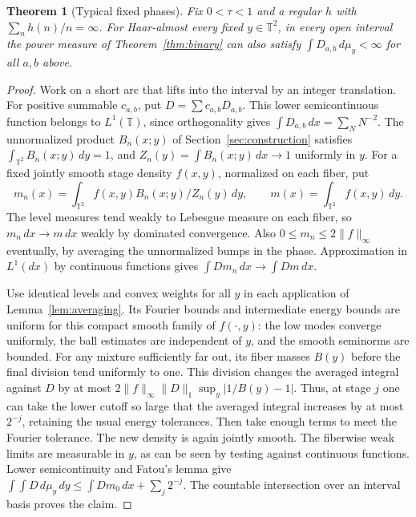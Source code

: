 \documentclass[11pt,a4paper,reqno]{amsart}
\newtheorem{theorem}{Theorem}[section]
\theoremstyle{definition}
\theoremstyle{remark}
\numberwithin{equation}{section}
\begin{document}
\begin{theorem}[Typical fixed phases]\label{thm:del}
Fix \(0<\tau<1\) and a regular \(h\) with \(\sum_n h(n)/n=\infty\).
For Haar-almost every fixed \(y\in\mathbb T^2\), in every open
interval the power measure of Theorem~\ref{thm:binary} can also
satisfy \(\int D_{a,b}\,d\mu_y<\infty\) for all \(a,b\) above.
\end{theorem}
\begin{proof}
Work on a short arc that lifts into the interval by an integer
translation. For positive summable \(c_{a,b}\), put
\(D=\sum c_{a,b}D_{a,b}\). This lower semicontinuous function
belongs to \(L^1(\mathbb T)\), since orthogonality gives
\(\int D_{a,b}\,dx=\sum_N N^{-2}\). The unnormalized product
\(B_n(x;y)\) of Section~\ref{sec:construction} satisfies
\(\int_{\mathbb T^2}B_n(x;y)\,dy=1\), and
\(Z_n(y)=\int B_n(x;y)\,dx\to1\) uniformly in \(y\).
For a fixed jointly smooth stage density \(f(x,y)\), normalized on
each fiber, put
\[
 m_n(x)=\int_{\mathbb T^2} f(x,y)B_n(x;y)/Z_n(y)\,dy,\qquad
 m(x)=\int_{\mathbb T^2} f(x,y)\,dy .
\]
The level measures tend weakly to Lebesgue measure on each fiber,
so \(m_n\,dx\to m\,dx\) weakly by dominated convergence.
Also \(0\le m_n\le2\|f\|_\infty\) eventually, by averaging the
unnormalized bumps in the phase. Approximation in \(L^1(dx)\) by
continuous functions gives \(\int Dm_n\,dx\to\int Dm\,dx\).

Use identical levels and convex weights for all \(y\) in each
application of Lemma~\ref{lem:averaging}. Its Fourier bounds and
intermediate energy bounds are uniform for this compact smooth family
of \(f(\cdot,y)\): the low modes converge uniformly, the ball
estimates are independent of \(y\), and the smooth seminorms are
bounded. For any mixture sufficiently far out, its fiber masses
\(B(y)\) before the final division tend uniformly to one. This
division changes the averaged integral against \(D\) by at most
\(2\|f\|_\infty\|D\|_1\sup_y|1/B(y)-1|\). Thus, at stage \(j\)
one can take the lower cutoff so large that the averaged integral
increases by at most \(2^{-j}\), retaining the usual energy
tolerances. Then take enough terms to meet the Fourier tolerance.
The new density is again jointly smooth. The fiberwise weak limits
are measurable in \(y\), as can be seen by testing against continuous
functions. Lower semicontinuity and Fatou's lemma give
\(\int\!\int D\,d\mu_y\,dy\le\int Dm_0\,dx+\sum_j2^{-j}\).
The countable intersection over an interval basis proves the claim.
\end{proof}
\end{document}
